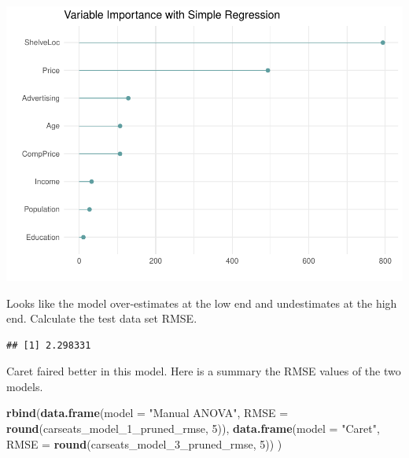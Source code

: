 \documentclass[
]{book}
\newenvironment{Shaded}{\begin{snugshade}}{\end{snugshade}}
\newcommand{\DataTypeTok}[1]{\textcolor[rgb]{0.13,0.29,0.53}{#1}}
\newcommand{\DecValTok}[1]{\textcolor[rgb]{0.00,0.00,0.81}{#1}}
\newcommand{\KeywordTok}[1]{\textcolor[rgb]{0.13,0.29,0.53}{\textbf{#1}}}
\newcommand{\NormalTok}[1]{#1}
\newcommand{\OperatorTok}[1]{\textcolor[rgb]{0.81,0.36,0.00}{\textbf{#1}}}
\newcommand{\StringTok}[1]{\textcolor[rgb]{0.31,0.60,0.02}{#1}}
\begin{document}
\includegraphics{data-sci_files/figure-latex/unnamed-chunk-102-1.pdf}

Looks like the model over-estimates at the low end and undestimates at the high end. Calculate the test data set RMSE.

\begin{Shaded}
\end{Shaded}

\begin{verbatim}
## [1] 2.298331
\end{verbatim}

Caret faired better in this model. Here is a summary the RMSE values of the two models.

\begin{Shaded}
\begin{Highlighting}[]
\KeywordTok{rbind}\NormalTok{(}\KeywordTok{data.frame}\NormalTok{(}\DataTypeTok{model =} \StringTok{"Manual ANOVA"}\NormalTok{, }
                 \DataTypeTok{RMSE =} \KeywordTok{round}\NormalTok{(carseats_model_}\DecValTok{1}\NormalTok{_pruned_rmse, }\DecValTok{5}\NormalTok{)), }
      \KeywordTok{data.frame}\NormalTok{(}\DataTypeTok{model =} \StringTok{"Caret"}\NormalTok{, }
                 \DataTypeTok{RMSE =} \KeywordTok{round}\NormalTok{(carseats_model_}\DecValTok{3}\NormalTok{_pruned_rmse, }\DecValTok{5}\NormalTok{))}
\NormalTok{)}
\end{Highlighting}
\end{Shaded}
\end{document}
